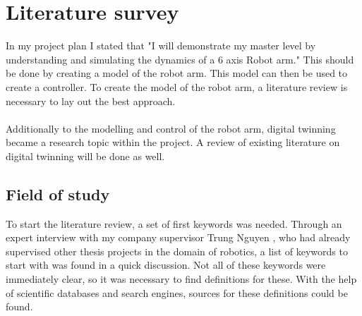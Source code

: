 \chapter{Literature survey}

In my project plan I stated that "I will demonstrate my master level by understanding and simulating the dynamics of a 6 axis Robot arm."\cite{ProjectPlan}
This should be done by creating a model of the robot arm. This model can then be used to create a controller.
To create the model of the robot arm, a literature review is necessary to lay out the best approach.\\
\\
Additionally to the modelling and control of the robot arm, digital twinning became a research topic within the project. A review of existing literature on digital twinning will be done as well.
\medskip

\section{Field of study}

To start the literature review, a set of first keywords was needed. Through an expert interview with my company supervisor Trung Nguyen \cite{Trung} , who had already supervised other thesis projects in the domain of robotics, a list of keywords to start with was found in a quick discussion. Not all of these keywords were immediately clear, so it was necessary to find definitions for these. With the help of scientific databases and search engines, sources for these definitions could be found.\\




